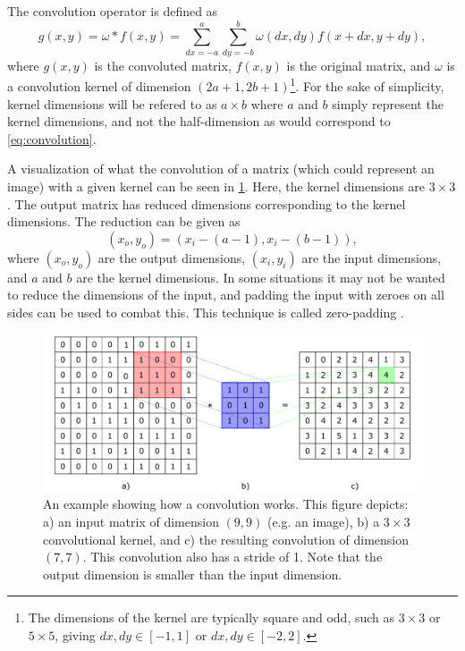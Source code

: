 The convolution operator is defined as 
\begin{equation}
    \label{eq:convolution}
    g(x,y) = \omega \ast f(x,y) = \sum_{dx=-a}^{a}\sum_{dy=-b}^{b} \omega(dx,dy)f(x+dx,y+dy),
\end{equation}
where $g(x,y)$ is the convoluted matrix, $f(x,y)$ is the original matrix, and $\omega$ is a convolution kernel of dimension $(2a+1,2b+1)$\footnote{The dimensions of the kernel are typically square and odd, such as $3\times3$ or $5\times5$, giving $dx,dy\in[-1,1]$ or $dx,dy\in[-2,2]$. }. For the sake of simplicity, kernel dimensions will be refered to as $a\times b$ where $a$ and $b$ simply represent the kernel dimensions, and not the half-dimension as would correspond to \cref{eq:convolution}. 

A visualization of what the convolution of a matrix (which could represent an image) with a given kernel can be seen in \cref{fig:convolution}. Here, the kernel dimensions are $3\times3$. The output matrix has reduced dimensions corresponding to the kernel dimensions. The reduction can be given as 
\begin{equation}
    \left( x_o,y_o \right) = \left( x_i - \left(a - 1\right), x_i - \left( b - 1 \right) \right),
\end{equation}
where $(x_o,y_o)$ are the output dimensions, $(x_i,y_i)$ are the input dimensions, and $a$ and $b$ are the kernel dimensions. In some situations it may not be wanted to reduce the dimensions of the input, and padding the input with zeroes on all sides can be used to combat this. This technique is called zero-padding \cite{oshea2015introduction}. 
\begin{figure}[htbp]  
    \centering
    \includegraphics[width=.85\textwidth]{figures/convolution.pdf}
    \caption[Convolution example]{An example showing how a convolution works. This figure depicts: a) an input matrix of dimension $(9,9)$ (e.g. an image), b) a $3\times3$ convolutional kernel, and c) the resulting convolution of dimension $(7,7)$. This convolution also has a stride of 1. Note that the output dimension is smaller than the input dimension. }
    \label{fig:convolution}
\end{figure}

